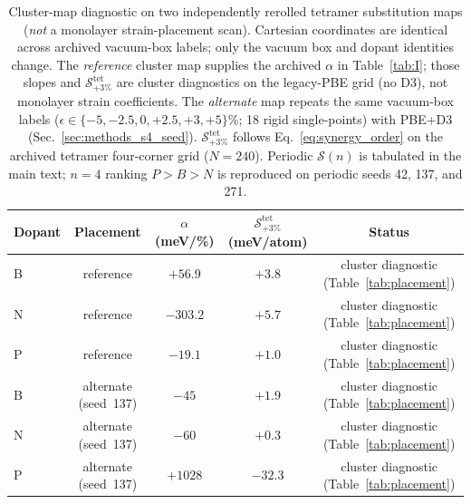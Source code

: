 \begin{table}[t]
\begin{table}[t]
\caption{\label{tab:sgrid}Cluster-map diagnostic on two independently rerolled tetramer substitution maps (\emph{not} a monolayer strain-placement scan). Cartesian coordinates are identical across archived vacuum-box labels; only the vacuum box and dopant identities change.
The \emph{reference} cluster map supplies the archived $\alpha$ in Table~\ref{tab:I}; those slopes and $\mathcal{S}_{+3\%}^{\mathrm{tet}}$ are cluster diagnostics on the legacy-PBE grid (no D3), not monolayer strain coefficients.
The \emph{alternate} map repeats the same vacuum-box labels ($\epsilon\in\{-5,-2.5,0,+2.5,+3,+5\}$\%; 18 rigid single-points) with PBE+D3 (Sec.~\ref{sec:methods_s4_seed}).
$\mathcal{S}_{+3\%}^{\mathrm{tet}}$ follows Eq.~\eqref{eq:synergy_order} on the archived tetramer four-corner grid ($N{=}240$).
Periodic $\mathcal{S}(n)$ is tabulated in the main text; $n{=}4$ ranking $P{>}B{>}N$ is reproduced on periodic seeds 42, 137, and 271.}
\begin{ruledtabular}
\begin{tabular}{lcccc}
Dopant & Placement & $\alpha$ (meV/\%) & $\mathcal{S}_{+3\%}^{\mathrm{tet}}$ (meV/atom) & Status \\
\hline
B & reference & $+56.9$ & $+3.8$ & cluster diagnostic (Table~\ref{tab:placement}) \\
N & reference & $-303.2$ & $+5.7$ & cluster diagnostic (Table~\ref{tab:placement}) \\
P & reference & $-19.1$ & $+1.0$ & cluster diagnostic (Table~\ref{tab:placement}) \\
B & alternate (seed~137) & $-45$ & $+1.9$ & cluster diagnostic (Table~\ref{tab:placement}) \\
N & alternate (seed~137) & $-60$ & $+0.3$ & cluster diagnostic (Table~\ref{tab:placement}) \\
P & alternate (seed~137) & $+1028$ & $-32.3$ & cluster diagnostic (Table~\ref{tab:placement}) \\
\end{tabular}
\end{ruledtabular}
\end{table}


\end{table}
